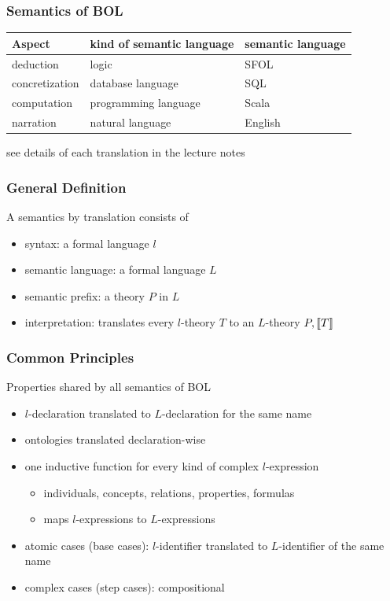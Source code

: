 \documentclass{beamer}
\begin{document}
\begin{frame}\frametitle{Semantics of BOL}
\begin{center}
\begin{tabular}{lll}
Aspect & kind of semantic language & semantic language\\
\hline 
deduction & logic & SFOL \\
concretization & database language & SQL \\
computation & programming language & Scala \\
narration & natural language & English \\
\end{tabular}
\end{center}

see details of each translation in the lecture notes
\end{frame}

\begin{frame}\frametitle{General Definition}
A semantics by translation consists of
\begin{itemize}
 \item syntax: a formal language $l$
 \item semantic language: a formal language $L$
 \item semantic prefix: a theory $P$ in $L$
 \item interpretation: translates every $l$-theory $T$ to an $L$-theory $P,\llbracket T\rrbracket$
\end{itemize}
\end{frame}

\begin{frame}\frametitle{Common Principles}
Properties shared by all semantics of BOL
\begin{itemize}
 \item $l$-declaration translated to $L$-declaration for the same name
 \item ontologies translated declaration-wise
 \item one inductive function for every kind of complex $l$-expression
  \begin{itemize}
   \item individuals, concepts, relations, properties, formulas
   \item maps $l$-expressions to $L$-expressions
  \end{itemize}
 \item atomic cases (base cases): $l$-identifier translated to $L$-identifier of the same name
 \item complex cases (step cases): compositional
\end{itemize}
\end{frame}
\end{document}
